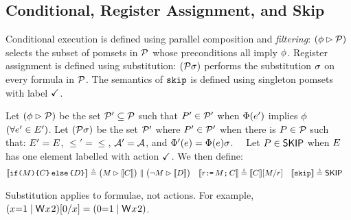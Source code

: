 

\subsection{Conditional, Register Assignment, and Skip}
Conditional execution is defined using parallel composition and
\emph{filtering}: $(\aForm \guard \aPSS)$ selects the subset of pomsets in
$\aPSS$ whose preconditions all imply $\aForm$.  Register assignment is defined using
substitution: $(\aPSS\aSub)$ performs the substitution $\aSub$ on every
formula in $\aPSS$.  The semantics of $\SKIP$ is defined using singleton
pomsets with label $\DSTOP$.
\begin{definition}
  Let $(\aForm \guard \aPSS)$ be the set $\aPSS'\subseteq\aPSS$ such that
  $\aPS'\in\aPSS'$ when $\labelingForm(\aEv')$ implies $\aForm$ %
  $(\forall\aEv'\in\Event')$. 
  Let $(\aPSS\aSub)$ be the set $\aPSS'$ where $\aPS'\in\aPSS'$ when there is
  $\aPS\in\aPSS$ such that: $\Event' = \Event$, ${\le'} = {\le}$,
  $\labelingAct' = \labelingAct$, and
  $\labelingForm'(\aEv) = \labelingForm(\aEv)\aSub$.
  \ \ Let $\aPS\in\stopPS$ when $\Event$ has one element labelled with action
  $\DSTOP$\!\!.
  We then define:
\begin{align*}
  \sem[\aThrd]{\IF{\aExp} \THEN \aCmd \ELSE \bCmd \FI} & \eqdef
  \bigl(\aExp \guard \sem[\aThrd]{\aCmd}\bigr) \parallel \bigl(\lnot\aExp \guard \sem[\aThrd]{\bCmd}\bigr) 
  &
  \sem[\aThrd]{\aReg\GETS\aExp\SEMI \aCmd} & \eqdef
  \sem[\aThrd]{\aCmd}[\aExp/\aReg] 
  &  
  \sem[\aThrd]{\SKIP} & \eqdef
  \stopPS
\end{align*}
\end{definition}
Substitution applies to formulae, not actions.  For example,
$(x{=}1\mid\DW{x}{2})[0/x]=(0{=}1\mid\DW{x}{2})$. %

